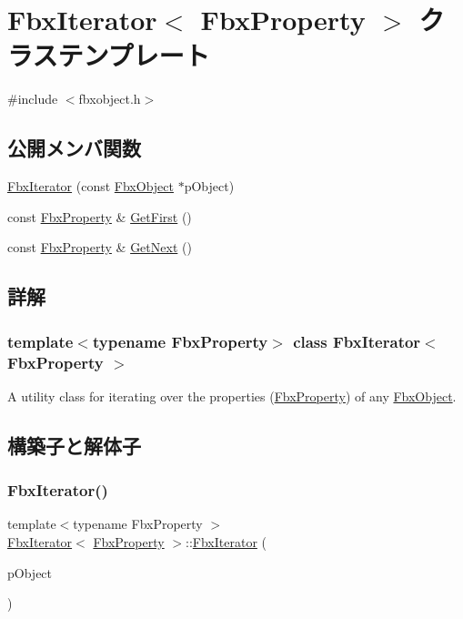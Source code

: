 \hypertarget{class_fbx_iterator}{}\section{Fbx\+Iterator$<$ Fbx\+Property $>$ クラステンプレート}
\label{class_fbx_iterator}


{\ttfamily \#include $<$fbxobject.\+h$>$}

\subsection*{公開メンバ関数}
\begin{DoxyCompactItemize}
\item 
\hyperlink{class_fbx_iterator_ab73c5a75000f53f19a1a0b8ebf662210}{Fbx\+Iterator} (const \hyperlink{class_fbx_object}{Fbx\+Object} $\ast$p\+Object)
\item 
const \hyperlink{class_fbx_property}{Fbx\+Property} \& \hyperlink{class_fbx_iterator_a3ebfa1d0238b2b13c9163a26c0687cb2}{Get\+First} ()
\item 
const \hyperlink{class_fbx_property}{Fbx\+Property} \& \hyperlink{class_fbx_iterator_a73f4bbaedea5a2f646d2195877eedd17}{Get\+Next} ()
\end{DoxyCompactItemize}


\subsection{詳解}
\subsubsection*{template$<$typename Fbx\+Property$>$\newline
class Fbx\+Iterator$<$ Fbx\+Property $>$}

A utility class for iterating over the properties (\hyperlink{class_fbx_property}{Fbx\+Property}) of any \hyperlink{class_fbx_object}{Fbx\+Object}. 

\subsection{構築子と解体子}
\mbox{\label{class_fbx_iterator_ab73c5a75000f53f19a1a0b8ebf662210}} 
\subsubsection{\texorpdfstring{Fbx\+Iterator()}{FbxIterator()}}
{\footnotesize\ttfamily template$<$typename Fbx\+Property $>$ \\
\hyperlink{class_fbx_iterator}{Fbx\+Iterator}$<$ \hyperlink{class_fbx_property}{Fbx\+Property} $>$\+::\hyperlink{class_fbx_iterator}{Fbx\+Iterator} (\begin{DoxyParamCaption}\item[{const \hyperlink{class_fbx_object}{Fbx\+Object} $\ast$}]{p\+Object }\end{DoxyParamCaption})}

